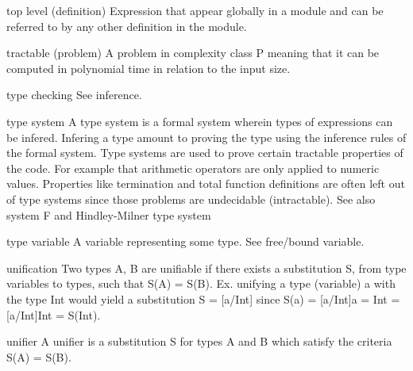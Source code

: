 top level (definition)
Expression that appear globally in a module and can be referred to by any other definition in the module.

tractable (problem)
A problem in complexity class P meaning that it can be computed in polynomial time in relation to the input size.

type checking
See inference.

type system
A type system is a formal system wherein types of expressions can be infered. Infering a type amount to proving the type using the inference rules of the formal system.
Type systems are used to prove certain tractable properties of the code. For example that arithmetic operators are only applied to numeric values. Properties like termination and total function definitions are often left out of type systems since those problems are undecidable (intractable).
See also system F and Hindley-Milner type system

type variable
A variable representing some type. See free/bound variable.

unification
Two types A, B are unifiable if there exists a substitution S, from type variables to types, such that S(A) = S(B).
Ex. unifying a type (variable) a with the type Int would yield a substitution S = [a/Int] since S(a) = [a/Int]a = Int = [a/Int]Int = S(Int).

unifier
A unifier is a substitution S for types A and B which satisfy the criteria S(A) = S(B).
